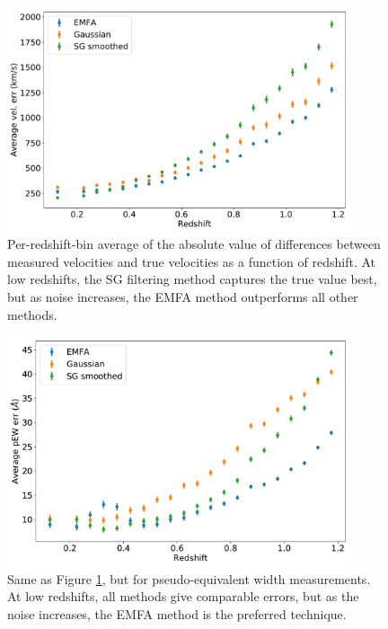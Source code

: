 \begin{figure}[htbp]
    \centering
    \includegraphics[width=0.9\textwidth]{figures/si_feat_pca/wfirst_vel_err.pdf}
    \caption{Per-redshift-bin average of the absolute value of differences between measured velocities and true velocities as a function of redshift. At low redshifts, the SG filtering method captures the true value best, but as noise increases, the EMFA method outperforms all other methods.}
    \label{wfirst_vel_err_vs_z}
\end{figure}

\begin{figure}[htbp]
    \centering
    \includegraphics[width=0.9\textwidth]{figures/si_feat_pca/wfirst_pew_err.pdf}
    \caption{Same as Figure \ref{wfirst_vel_err_vs_z}, but for pseudo-equivalent width measurements. At low redshifts, all methods give comparable errors, but as the noise increases, the EMFA method is the preferred technique.}
    \label{wfirst_ew_err_vs_z}
\end{figure}

